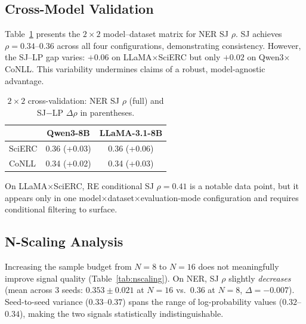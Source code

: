 \documentclass[11pt,a4paper]{article}
\begin{document}
\subsection{Cross-Model Validation}
\label{sec:cross_model}

Table~\ref{tab:cross_model} presents the $2\times 2$ model--dataset matrix for NER SJ $\rho$. SJ achieves $\rho = 0.34$--$0.36$ across all four configurations, demonstrating consistency. However, the SJ--LP gap varies: $+0.06$ on LLaMA$\times$SciERC but only $+0.02$ on Qwen3$\times$CoNLL. This variability undermines claims of a robust, model-agnostic advantage.

\begin{table}[t]
\centering
\small
\caption{$2 \times 2$ cross-validation: NER SJ $\rho$ (full) and SJ$-$LP $\Delta\rho$ in parentheses.}
\label{tab:cross_model}
\begin{tabular}{lcc}
\toprule
 & Qwen3-8B & LLaMA-3.1-8B \\
\midrule
SciERC & 0.36 (+0.03) & 0.36 (+0.06) \\
CoNLL & 0.34 (+0.02) & 0.34 (+0.03) \\
\bottomrule
\end{tabular}
\end{table}

On LLaMA$\times$SciERC, RE conditional SJ $\rho = 0.41$ is a notable data point, but it appears only in one model$\times$dataset$\times$evaluation-mode configuration and requires conditional filtering to surface.

\subsection{N-Scaling Analysis}
\label{sec:nscaling}

Increasing the sample budget from $N=8$ to $N=16$ does not meaningfully improve signal quality (Table~\ref{tab:nscaling}). On NER, SJ $\rho$ slightly \emph{decreases} (mean across 3 seeds: $0.353 \pm 0.021$ at $N=16$ vs.\ $0.36$ at $N=8$, $\Delta = -0.007$). Seed-to-seed variance ($0.33$--$0.37$) spans the range of log-probability values ($0.32$--$0.34$), making the two signals statistically indistinguishable.
\end{document}
